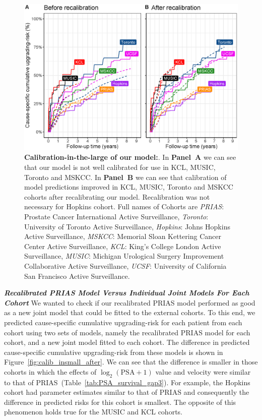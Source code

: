 \begin{figure}[!htb]
\centerline{\includegraphics[width=\columnwidth]{images/calib_before_after.eps}}
\caption{\textbf{Calibration-in-the-large of our model:}. In \textbf{Panel~A} we can see that our model is not well calibrated for use in KCL, MUSIC, Toronto and MSKCC. In \textbf{Panel~B} we can see that calibration of model predictions improved in KCL, MUSIC, Toronto and MSKCC cohorts after recalibrating our model. Recalibration was not necessary for Hopkins cohort. Full names of Cohorts are \textit{PRIAS}: Prostate Cancer International Active Surveillance, \textit{Toronto}: University of Toronto Active Surveillance, \textit{Hopkins}: Johns Hopkins Active Surveillance, \textit{MSKCC}: Memorial Sloan Kettering Cancer Center Active Surveillance, \textit{KCL}: King's College London Active Surveillance, \textit{MUSIC}: Michigan Urological Surgery Improvement Collaborative Active Surveillance, \textit{UCSF}: University of California San Francisco Active Surveillance.}
\label{fig:calib_before_after}
\end{figure}

\clearpage
\textbf{\textit{Recalibrated PRIAS Model Versus Individual Joint Models For Each Cohort}}
We wanted to check if our recalibrated PRIAS model performed as good as a new joint model that could be fitted to the external cohorts. To this end, we predicted cause-specific cumulative upgrading-risk for each patient from each cohort using two sets of models, namely the recalibrated PRIAS model for each cohort, and a new joint model fitted to each cohort. The difference in predicted cause-specific cumulative upgrading-risk from these models is shown in Figure~\ref{fig:calib_insmall_after}. We can see that the difference is smaller in those cohorts in which the effects of $\log_2 (\mbox{PSA} + 1)$ value and velocity were similar to that of PRIAS~(Table~\ref{tab:PSA_survival_gap3}). For example, the Hopkins cohort had parameter estimates similar to that of PRIAS and consequently the difference in predicted risks for this cohort is smallest. The opposite of this phenomenon holds true for the MUSIC and KCL cohorts.
 
